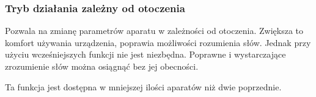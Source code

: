 \documentclass{beamer}
\begin{document}
\begin{frame}
\frametitle{Tryb działania zależny od otoczenia}
Pozwala na zmianę parametrów aparatu w zależności od otoczenia. Zwiększa to komfort używania urządzenia, poprawia możliwości rozumienia słów. Jednak przy użyciu wcześniejszych funkcji nie jest niezbędna. Poprawne i wystarczające zrozumienie słów można osiągnąć bez jej obecności.

Ta funkcja jest dostępna w mniejszej ilości aparatów niż dwie poprzednie.
\end{frame}



\end{document}
